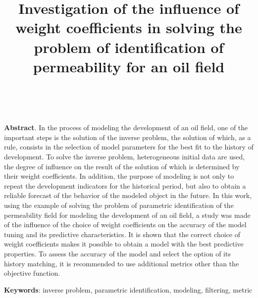 \documentclass[
11pt,%
tightenlines,%
twoside,%
onecolumn,%
nofloats,%
nobibnotes,%
nofootinbib,%
superscriptaddress,%
noshowpacs,%
centertags]%
{revtex4}
\begin{document}
	
	
	
	\title{Investigation of the influence of weight coefficients in solving the problem of identification of permeability for an oil field}
	
	\author{~}
	
	
	
	\maketitle
	\textbf{Abstract}. In the process of modeling the development of an oil field, one of the important steps is the solution of the inverse problem, the solution of which, as a rule, consists in the selection of model parameters for the best fit to the history of development. To solve the inverse problem, heterogeneous initial data are used, the degree of influence on the result of the solution of which is determined by their weight coefficients. In addition, the purpose of modeling is not only to repeat the development indicators for the historical period, but also to obtain a reliable forecast of the behavior of the modeled object in the future.
	In this work, using the example of solving the problem of parametric identification of the permeability field for modeling the development of an oil field, a study was made of the influence of the choice of weight coefficients on the accuracy of the model tuning and its predictive characteristics. It is shown that the correct choice of weight coefficients makes it possible to obtain a model with the best predictive properties. To assess the accuracy of the model and select the option of its history matching, it is recommended to use additional metrics other than the objective function.

\textbf{Keywords}: inverse problem, parametric identification, modeling, filtering, metric
\end{document}
